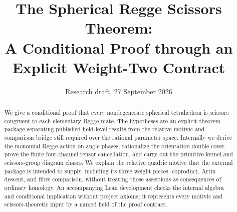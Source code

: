 \documentclass[11pt,reqno]{amsart}
\title[The spherical Regge theorem]
  {The Spherical Regge Scissors Theorem:\\
   A Conditional Proof through an Explicit Weight-Two Contract}
\author{}
\date{Research draft, 27 September 2026}
\begin{document}
\begin{abstract}
We give a conditional proof that every nondegenerate spherical tetrahedron
is scissors congruent to each elementary Regge mate.  The hypotheses are an
explicit theorem package separating published field-level results from the
relative motivic and comparison bridge still required over the rational
parameter space.  Internally we derive the monomial Regge action on angle
phases, rationalize the orientation double cover, prove the finite
four-channel tensor cancellation, and carry out the primitive-kernel and
scissors-group diagram chases.  We explain the relative quadric motive that
the external package is intended to supply, including its three weight
pieces, coproduct, Artin descent, and fibre comparison, without treating
those assertions as consequences of ordinary homology.  An accompanying
Lean development checks the internal algebra and conditional implication
without project axioms; it represents every motivic and scissors-theoretic
input by a named field of the proof contract.
\end{abstract}

\maketitle
\enlargethispage{20pt}
\tableofcontents









\end{document}
